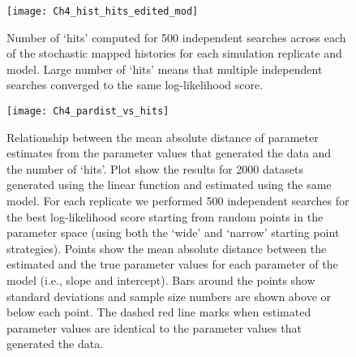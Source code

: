 \begin{figure}[hp]
	\centering
	\texttt{[image: Ch4\_hist\_hits\_edited\_mod]}
	\caption[Number of `hits' computed across each of the stochastic mapped histories for each simulation replicate and model.]{Number of `hits' computed for 500 independent searches across each of the stochastic mapped histories for each simulation replicate and model. Large number of `hits' means that multiple independent searches converged to the same log-likelihood score.}
	\label{fig:hist_hits}
\end{figure}

\begin{figure}[hp]
	\centering
	\texttt{[image: Ch4\_pardist\_vs\_hits]}
	\caption[Relationship between the mean absolute distance of parameter estimates from the parameter values that generated the data and the number of `hits' after 500 independent searches.]{Relationship between the mean absolute distance of parameter estimates from the parameter values that generated the data and the number of `hits'. Plot show the results for 2000 datasets generated using the linear function and estimated using the same model. For each replicate we performed 500 independent searches for the best log-likelihood score starting from random points in the parameter space (using both the `wide' and `narrow' starting point strategies). Points show the mean absolute distance between the estimated and the true parameter values for each parameter of the model (i.e., slope and intercept). Bars around the points show standard deviations and sample size numbers are shown above or below each point. The dashed red line marks when estimated parameter values are identical to the parameter values that generated the data.}
	\label{fig:pardist}
\end{figure}